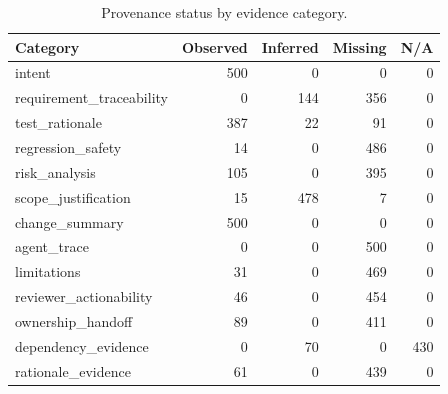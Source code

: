 \begin{table}[t]
\centering
\caption{Provenance status by evidence category.}
\label{tab:provenance-by-category}
\footnotesize
\begin{tabular}{@{}lrrrr@{}}
\toprule
Category & Observed & Inferred & Missing & N/A \\
\midrule
intent & 500 & 0 & 0 & 0 \\
requirement\_traceability & 0 & 144 & 356 & 0 \\
test\_rationale & 387 & 22 & 91 & 0 \\
regression\_safety & 14 & 0 & 486 & 0 \\
risk\_analysis & 105 & 0 & 395 & 0 \\
scope\_justification & 15 & 478 & 7 & 0 \\
change\_summary & 500 & 0 & 0 & 0 \\
agent\_trace & 0 & 0 & 500 & 0 \\
limitations & 31 & 0 & 469 & 0 \\
reviewer\_actionability & 46 & 0 & 454 & 0 \\
ownership\_handoff & 89 & 0 & 411 & 0 \\
dependency\_evidence & 0 & 70 & 0 & 430 \\
rationale\_evidence & 61 & 0 & 439 & 0 \\
\bottomrule
\end{tabular}
\end{table}
